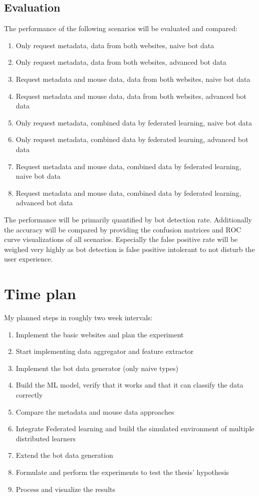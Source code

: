\documentclass[
    fontsize=12pt,
    headings=small,
    parskip=half,           %
    bibliography=totoc,
    numbers=noenddot,       %
    open=any,               %
    final                   %
    ]{scrreprt}
\begin{document}
\section{Evaluation}

The performance of the following scenarios will be evaluated and compared:

\begin{enumerate}
	\item Only request metadata, data from both websites, naive bot data
	\item Only request metadata, data from both websites, advanced bot data
	\item Request metadata and mouse data, data from both websites, naive bot data
	\item Request metadata and mouse data, data from both websites, advanced bot data
	\item Only request metadata, combined data by federated learning, naive bot data
	\item Only request metadata, combined data by federated learning, advanced bot data
	\item Request metadata and mouse data, combined data by federated learning, naive bot data
	\item Request metadata and mouse data, combined data by federated learning, advanced bot data
\end{enumerate}

The performance will be primarily quantified by bot detection rate. Additionally the accuracy will be compared by providing the confusion matrices and ROC curve visualizations of all scenarios. Especially the false positive rate will be weighed very highly as bot detection is false positive intolerant to not disturb the user experience.

\chapter{Time plan}

My planned steps in roughly two week intervals: \\

\begin{enumerate}
	\item Implement the basic websites and plan the experiment
	\item Start implementing data aggregator and feature extractor
	\item Implement the bot data generator (only naive types)
	\item Build the ML model, verify that it works and that it can classify the data correctly
	\item Compare the metadata and mouse data approaches
	\item Integrate Federated learning and build the simulated environment of multiple distributed learners
	\item Extend the bot data generation
	\item Formulate and perform the experiments to test the thesis' hypothesis
	\item Process and visualize the results
\end{enumerate}


\begin{raggedright}
  \printbibliography
\end{raggedright}
\end{document}
